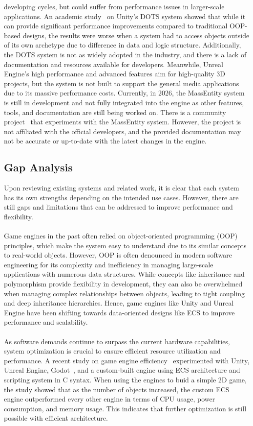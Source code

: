 developing cycles, but could suffer from performance issues in larger-scale applications.
An academic study~\cite{DOTS_Study} on Unity's DOTS system showed that while it can provide significant
performance improvements compared to traditional OOP-based designs, the results were worse when a system had to
access objects outside of its own archetype due to difference in data and logic structure.
Additionally, the DOTS system is not as widely adopted in the industry, and there is a lack of documentation
and resources available for developers.
Meanwhile, Unreal Engine's high performance and advanced features aim for high-quality
3D projects, but the system is not built to support the general media applications due to its massive 
performance costs.
Currently, in 2026, the MassEntity system is still in development and not fully integrated into the engine as
other features, tools, and documentation are still being worked on.
There is a community project~\cite{MassSample} that experiments with the MassEntity system.
However, the project is not affiliated with the official developers, and the provided documentation may not be
accurate or up-to-date with the latest changes in the engine.

\subsection{Gap Analysis}
\label{subsec:gap-analysis}

Upon reviewing existing systems and related work, it is clear that each system has its own strengths depending
on the intended use cases.
However, there are still gaps and limitations that can be addressed to improve performance and flexibility.
\\\\
Game engines in the past often relied on object-oriented programming (OOP) principles, which make the system easy to 
understand due to its similar concepts to real-world objects.
However, OOP is often denounced in modern software engineering for its complexity and inefficiency in managing 
large-scale applications with numerous data structures.
While concepts like inheritance and polymorphism provide flexibility in development, they can also be overwhelmed 
when managing complex relationships between objects, leading to tight coupling and deep inheritance hierarchies.
Hence, game engines like Unity and Unreal Engine have been shifting towards data-oriented designs like ECS to improve 
performance and scalability.
\\\\
As software demands continue to surpass the current hardware capabilities, system optimization is crucial to ensure 
efficient resource utilization and performance.
A recent study on game engine efficiency~\cite{Game_Engine_Efficiency} experimented with Unity, Unreal Engine, 
Godot~\cite{Godot_Engine}, and a custom-built engine using ECS architecture and scripting system in C syntax.
When using the engines to buid a simple 2D game, the study showed that as the number of objects increased, the custom 
ECS engine outperformed every other engine in terms of CPU usage, power consumption, and memory usage.
This indicates that further optimization is still possible with efficient architecture.


